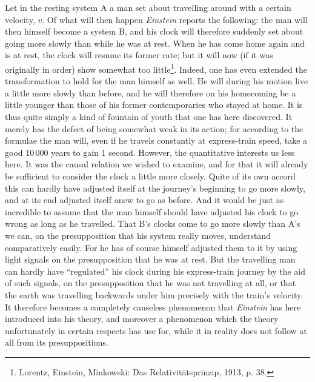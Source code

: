\documentclass[12pt,a4paper]{article}
\begin{document}
Let in the resting system A a man set about travelling around with a certain
velocity, $v$. Of what will then happen \emph{Einstein} reports the following:
the man will then himself become a system B, and his clock will therefore
suddenly set about going more slowly than while he was at rest. When he has
come home again and is at rest, the clock will resume its former rate; but it
will now (if it was originally in order) show somewhat too
little\footnote{Lorentz, Einstein, Minkowski: Das Relativitätsprinzip, 1913,
p. 38.}. Indeed, one has even extended the transformation to hold for the man
himself as well. He will during his motion live a little more slowly than
before, and he will therefore on his homecoming be a little younger than those
of his former contemporaries who stayed at home. It is thus quite simply a
kind of fountain of youth that one has here discovered. It merely has the
defect of being somewhat weak in its action; for according to the formulae the
man will, even if he travels constantly at express-train speed, take a good
10\,000 years to gain 1 second. However, the quantitative interests us less
here. It was the causal relation we wished to examine, and for that it will
already be sufficient to consider the clock a little more closely. Quite of
its own accord this can hardly have adjusted itself at the journey's beginning
to go more slowly, and at its end adjusted itself anew to go as before. And it
would be just as incredible to assume that the man himself should have
adjusted his clock to go wrong as long as he travelled. That B's clocks come
to go more slowly than A's we can, on the presupposition that his system
really moves, understand comparatively easily. For he has of course himself
adjusted them to it by using light signals on the presupposition that he was
at rest. But the travelling man can hardly have ``regulated'' his clock during
his express-train journey by the aid of such signals, on the presupposition
that he was not travelling at all, or that the earth was travelling backwards
under him precisely with the train's velocity. It therefore becomes a
completely causeless phenomenon that \emph{Einstein} has here introduced into
his theory, and moreover a phenomenon which the theory unfortunately in
certain respects has
use for, while it in reality does not follow at all from its presuppositions.
\end{document}

